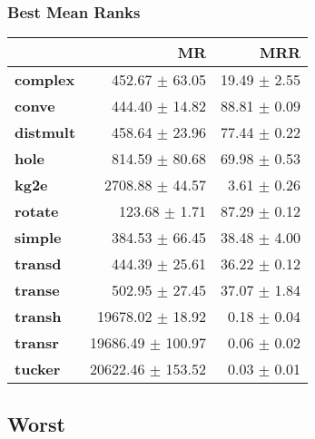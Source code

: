 \documentclass{article}
\begin{document}
    \subsubsection{Best Mean Ranks}
    \begin{center}
    \begin{tabular}{lrr}
\toprule
{} &                 MR &           MRR \\
\midrule
\textbf{complex } &     452.67 $\pm$ 63.05 &  19.49 $\pm$ 2.55 \\
\textbf{conve   } &     444.40 $\pm$ 14.82 &  88.81 $\pm$ 0.09 \\
\textbf{distmult} &     458.64 $\pm$ 23.96 &  77.44 $\pm$ 0.22 \\
\textbf{hole    } &     814.59 $\pm$ 80.68 &  69.98 $\pm$ 0.53 \\
\textbf{kg2e    } &    2708.88 $\pm$ 44.57 &   3.61 $\pm$ 0.26 \\
\textbf{rotate  } &      123.68 $\pm$ 1.71 &  87.29 $\pm$ 0.12 \\
\textbf{simple  } &     384.53 $\pm$ 66.45 &  38.48 $\pm$ 4.00 \\
\textbf{transd  } &     444.39 $\pm$ 25.61 &  36.22 $\pm$ 0.12 \\
\textbf{transe  } &     502.95 $\pm$ 27.45 &  37.07 $\pm$ 1.84 \\
\textbf{transh  } &   19678.02 $\pm$ 18.92 &   0.18 $\pm$ 0.04 \\
\textbf{transr  } &  19686.49 $\pm$ 100.97 &   0.06 $\pm$ 0.02 \\
\textbf{tucker  } &  20622.46 $\pm$ 153.52 &   0.03 $\pm$ 0.01 \\
\bottomrule
\end{tabular}

    \end{center}
    \subsection{Worst}
\end{document}
